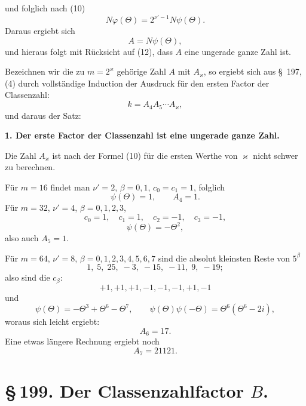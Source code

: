 \documentclass[11pt]{article}
\begin{document}
und folglich nach (10)
\[
N\varphi(\Theta)=2^{\nu'-1}N\psi(\Theta).
\]
Daraus ergiebt sich
\begin{equation}
A=N\psi(\Theta),
\tag{13}
\end{equation}
und hieraus folgt mit Rücksicht auf (12), dass $A$ eine ungerade ganze Zahl ist.

Bezeichnen wir die zu $m=2^\varkappa$ gehörige Zahl $A$ mit $A_\varkappa$, so ergiebt sich aus \S~197, (4) durch vollständige Induction der Ausdruck für den ersten Factor der Classenzahl:
\begin{equation}
k=A_4A_5\cdots A_\varkappa,
\tag{14}
\end{equation}
und daraus der Satz:
\begin{center}
\textbf{1. Der erste Factor der Classenzahl ist eine ungerade ganze Zahl.}
\end{center}
Die Zahl $A_\varkappa$ ist nach der Formel (10) für die ersten Werthe von $\varkappa$ nicht schwer zu berechnen.

Für $m=16$ findet man $\nu'=2$, $\beta=0,1$, $c_0=c_1=1$, folglich
\[
\psi(\Theta)=1,
\qquad
A_4=1.
\]
Für $m=32$, $\nu'=4$, $\beta=0,1,2,3$,
\[
c_0=1,
\quad c_1=1,
\quad c_2=-1,
\quad c_3=-1,
\]
\[
\psi(\Theta)=-\Theta^2,
\]
also auch $A_5=1$.

Für $m=64$, $\nu'=8$, $\beta=0,1,2,3,4,5,6,7$ sind die absolut kleinsten Reste von $5^\beta$
\[
1,\;5,\;25,\;-3,\;-15,\;-11,\;9,\;-19;
\]
also sind die $c_\beta$:
\[
+1,+1,+1,-1,-1,-1,+1,-1
\]
und
\[
\psi(\Theta)=-\Theta^3+\Theta^6-\Theta^7,
\qquad
\psi(\Theta)\psi(-\Theta)=\Theta^6(\Theta^6-2i),
\]
woraus sich leicht ergiebt:
\[
A_6=17.
\]
Eine etwas längere Rechnung ergiebt noch
\[
A_7=21121.
\]

\section*{\S\,199. Der Classenzahlfactor $B$.}
\end{document}

